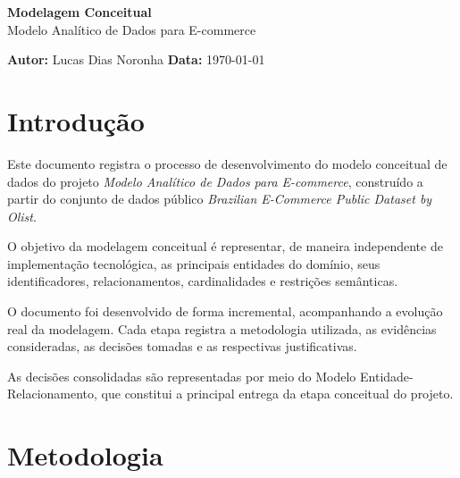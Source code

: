 \documentclass[12pt,a4paper]{article}
\newcommand{\projeto}{Modelo Analítico de Dados para E-commerce}
\newcommand{\autor}{Lucas Dias Noronha}
\newcommand{\dataDocumento}{\today}
\begin{document}
	
	
	\thispagestyle{empty}
	
	\vspace*{\fill}
	
	\begin{center}
		{\Huge \textcolor{AzulCorporativo}{\textbf{Modelagem Conceitual}}}\\[0.5cm]
		{\Large \textcolor{AzulPetroleo}{\projeto}}
	\end{center}
	
	\vspace*{\fill}
	
	\noindent
	\textbf{\textcolor{AzulCorporativo}{Autor:}} \autor
	\hfill
	\textbf{\textcolor{AzulCorporativo}{Data:}} \dataDocumento
	
	\newpage
	
	
	\tableofcontents
	\newpage
	
	
	\section{Introdução}
	
	Este documento registra o processo de desenvolvimento do modelo conceitual
	de dados do projeto \textit{\projeto}, construído a partir do conjunto de dados
	público \textit{Brazilian E-Commerce Public Dataset by Olist}.
	
	O objetivo da modelagem conceitual é representar, de maneira independente de
	implementação tecnológica, as principais entidades do domínio, seus
	identificadores, relacionamentos, cardinalidades e restrições semânticas.
	
	O documento foi desenvolvido de forma incremental, acompanhando a evolução
	real da modelagem. Cada etapa registra a metodologia utilizada, as evidências
	consideradas, as decisões tomadas e as respectivas justificativas.
	
	As decisões consolidadas são representadas por meio do
	Modelo Entidade-Relacionamento, que constitui a principal entrega da etapa
	conceitual do projeto.
	
	\section{Metodologia}
	
\end{document}
